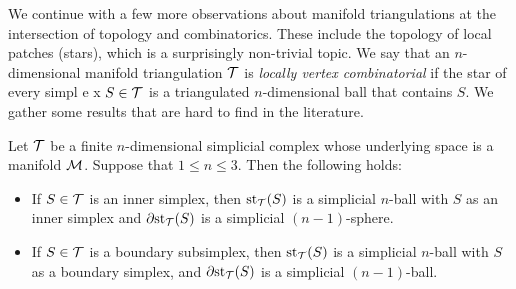 \documentclass[10pt,letterpaper]{article}
\newcommand\cye[1]{%
  \protect\leavevmode
  \begingroup
    \color{red!35!yellow}%
    #1%
  \endgroup
}
\begin{document}
We continue with a few more observations about manifold triangulations
at the intersection of topology and combinatorics. 
These include the topology of local \cye{patches} (stars), which is a surprisingly non-trivial topic. 
We say that an $n$-dimensional manifold triangulation ${\mathcal T}$ is \emph{locally vertex combinatorial}
if the star of every simpl\cye{e}x $S \in {\mathcal T}$ is a triangulated $n$-dimensional ball that contains $S$.
We gather some results that are hard to find in the literature. 

\begin{lemma}\label{lemma:startopology}
    Let ${\mathcal T}$ be a finite $n$-dimensional simplicial complex whose underlying space is a manifold ${\mathcal M}$.
    Suppose that $1 \leq n \leq 3$. Then the following holds:
    \begin{itemize}
        \item
        If $S \in {\mathcal T}$ is an inner simplex, 
        then $\operatorname{st}_{{\mathcal T}}(S)$ is a simplicial $n$-ball with $S$ as an inner simplex
        and ${\partial \rm st}_{{\mathcal T}}(S)$ is a simplicial $(n-1)$-sphere. 
        \item
        If $S \in {\mathcal T}$ is a boundary subsimplex, 
        then $\operatorname{st}_{{\mathcal T}}(S)$ is a simplicial $n$-ball with $S$ as a boundary simplex,
        and ${\partial \rm st}_{{\mathcal T}}(S)$ is a simplicial $(n-1)$-ball.
    \end{itemize}
\end{lemma}
\end{document}

